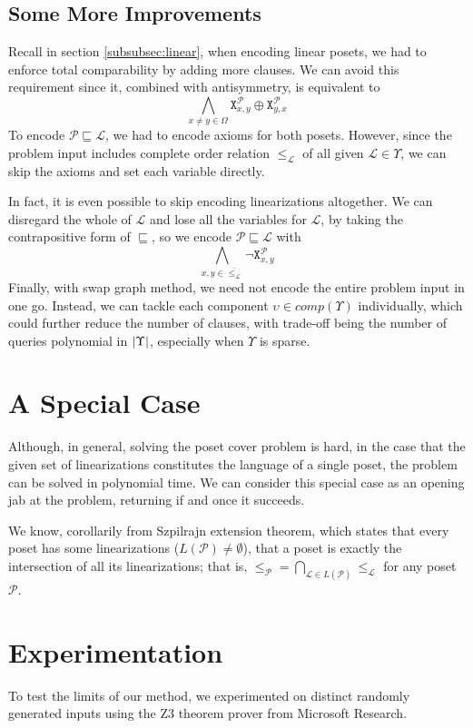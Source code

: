 \documentclass[12pt]{llncs}
\DeclarePairedDelimiter{\abs}{\lvert}{\rvert}
\let\oldleq\leq
\renewcommand{\leq}[1][]{\oldleq_{#1}}
\newcommand{\poset}[1]{\mathcal{#1}}
\newcommand{\uni}[1][]{\Omega_{#1}}
\newcommand{\lang}[1]{L(#1)}
\newcommand{\lext}{\sqsubseteq}
\newcommand{\complmt}[1]{\overline{#1}}
\newcommand{\satvar}[2]{\mathtt{X}_{#1}^{#2}}
\begin{document}
\subsection{Some More Improvements}
Recall in section \ref{subsubsec:linear}, when encoding linear posets, we had to enforce total comparability by adding more clauses. We can avoid this requirement since it, combined with antisymmetry, is equivalent to
\[
\bigwedge_{x \neq y \in \uni} \satvar{x,y}{\poset{P}} \oplus \satvar{y,x}{\poset{P}}
\]
To encode $\poset{P} \lext \poset{L}$, we had to encode axioms for both posets. However, since the problem input includes complete order relation $\leq[\poset{L}]$ of all given $\poset{L} \!\in\! \Upsilon$, we can skip the axioms and set each variable directly.

In fact, it is even possible to skip encoding linearizations altogether. We can disregard the whole of $\poset{L}$ and lose all the variables for $\poset{L}$, by taking the contrapositive form of $\lext$, so we encode $\poset{P} \lext \poset{L}$ with
\[
\bigwedge_{x,y \in \complmt{\leq[\poset{L}]}} \neg \satvar{x,y}{\poset{P}}
\]
Finally, with swap graph method, we need not encode the entire problem input in one go. Instead, we can tackle each component $\upsilon \!\in\! comp(\Upsilon)$ individually, which could further reduce the number of clauses, with trade-off being the number of queries polynomial in $\abs{\Upsilon}$, especially when $\Upsilon$ is sparse.

\section{A Special Case}
Although, in general, solving the poset cover problem is hard, in the case that the given set of linearizations constitutes the language of a single poset, the problem can be solved in polynomial time. We can consider this special case as an opening jab at the problem, returning if and once it succeeds.

We know, corollarily from Szpilrajn extension theorem, which states that every poset has some linearizations ($\lang{\poset{P}} \neq \emptyset$), that a poset is exactly the intersection of all its linearizations; that is, $\leq[\poset{P}] = \bigcap_{\poset{L} \in \lang{\poset{P}}} \leq[\poset{L}]$ for any poset $\poset{P}$.

\section{Experimentation}
To test the limits of our method, we experimented on distinct randomly generated inputs using the Z3\cite{de2008z3} theorem prover from Microsoft Research.
\end{document}

